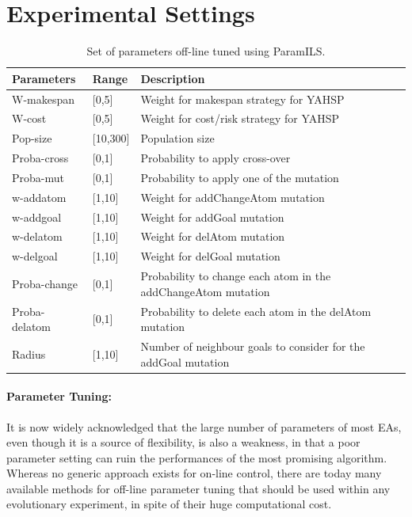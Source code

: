 \documentclass{llncs}
\def\YAHSP{{\sc YAHSP}}
\def\PARAMILS{{\sc ParamILS}}
\def\WMAKESPAN{{W-makespan}}
\def\WCOST{{W-cost}}
\begin{document}
\section{Experimental Settings}
\label{sec:settings}

\begin{table}[tb!]
\scriptsize
\begin{tabular}{|l|l|l|}
\hline
Parameters 	&	   Range 	&	Description\\					
\hline									
\WMAKESPAN\	&	[0,5]	&	Weight for makespan strategy for \YAHSP \\
\WCOST\ 	&	[0,5]	&	  Weight for cost/risk strategy for \YAHSP \\	
\hline
Pop-size 	&	[10,300]	&	 Population size\\
\hline
Proba-cross	&	[0,1]	&	 Probability to apply cross-over\\	
Proba-mut	&	[0,1]	&	 Probability to apply one of the mutation\\	
\hline
w-addatom	&	[1,10]	&	 Weight for addChangeAtom mutation\\					
w-addgoal	&	[1,10]	&	 Weight for addGoal mutation\\					
w-delatom	&	[1,10]	&	 Weight for delAtom mutation\\					
w-delgoal	&	[1,10]	&	 Weight for delGoal mutation\\												
\hline
Proba-change	&	[0,1]	&	 Probability to change each atom in the addChangeAtom mutation\\							
Proba-delatom	&	[0,1]	&	 Probability to delete each atom in the delAtom mutation\\								
Radius	&	[1,10]	&	  Number of neighbour goals to consider for the addGoal mutation\\		
\hline				
\end{tabular}
\caption{Set of parameters off-line tuned using \PARAMILS.}
\label{tab:parameters}
\end{table}

\paragraph{Parameter Tuning:}
\label{sec:tuning}
It is now widely acknowledged that the large number of parameters of most EAs, even though it is a source of flexibility, is also a weakness, in that a poor parameter setting can ruin the performances of the most promising algorithm. Whereas no generic approach exists for on-line control, there are today many available methods for off-line parameter tuning that should be used within any evolutionary experiment, in spite of their huge computational cost. 
\end{document}
